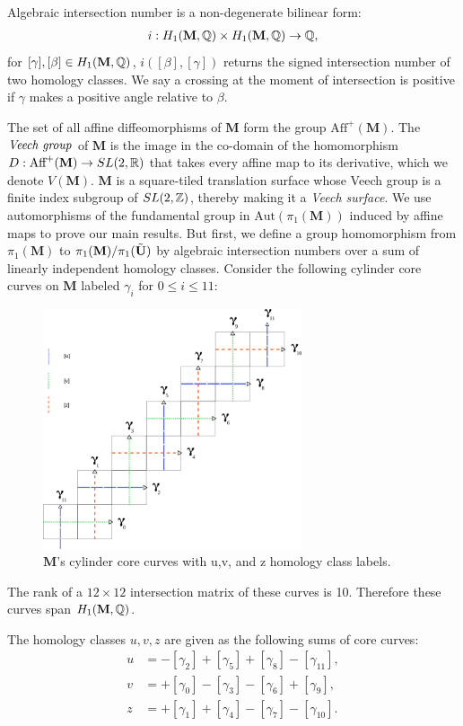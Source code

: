 \documentclass[]{article}
\def\bM{\mathbf{M}}
\begin{document}
\begin{Def}
Algebraic intersection number is a non-degenerate bilinear form:
\begin{align*}
i:H_1(\bM,\QQ)\times H_1(\bM,\QQ)\rightarrow\QQ,
\end{align*}
for $[\gamma],[\beta]\in H_1(\mathbf{M},\mathbb{Q})$, $i([\beta],[\gamma])$ returns the signed intersection number of two homology classes. We say a crossing at the moment of intersection is positive if $\gamma$ makes a positive angle relative to $\beta$. 
\end{Def}
The set of all affine diffeomorphisms of $\bM$ form the group $\text{Aff}^+(\bM)$. The $\emph{Veech group}$ of $\bM$ is the image in the co-domain of the homomorphism $D:\text{Aff}^+(\bM)\rightarrow SL(2,\RR)$ that takes every affine map to its derivative, which we denote $V(\bM)$. $\bM$ is a square-tiled translation surface whose Veech group is a finite index subgroup of $SL(2,\mathbb{Z})$, thereby making it a \emph{Veech surface}. We use automorphisms of the fundamental group in $\text{Aut}(\pi_1(\bM))$ induced by affine maps to prove our main results. But first, we define a group homomorphism from $\pi_1(\bM)$ to $\pi_1(\bM)/\pi_1(\btU)$ by algebraic intersection numbers over a sum of linearly independent homology classes. Consider the following cylinder core curves on $\bM$ labeled $\gamma_i$ for $0\leq i\leq 11$:
\begin{figure}[H]
\includegraphics[width=3in]{homologyclass.png}
\centering
\caption{$\bM$'s cylinder core curves with u,v, and z homology class labels.}
\label{fig:homology}
\end{figure}

The rank of a $12\times12$ intersection matrix of these curves is 10. Therefore these curves span $H_1(\bM,\QQ)$.


\begin{Def}
The homology classes $u,v,z$ are given as the following sums of core curves:
\begin{align*}
u &= -[\gamma_2] +[\gamma_5] + [\gamma_8] - [\gamma_{11}],\\
v &= +[\gamma_0] -[\gamma_3] -[\gamma_6] +[\gamma_9],\\
z &= +[\gamma_1] +[\gamma_4]-[\gamma_7]-[\gamma_{10}].
\end{align*}
\end{Def}
\end{document}
